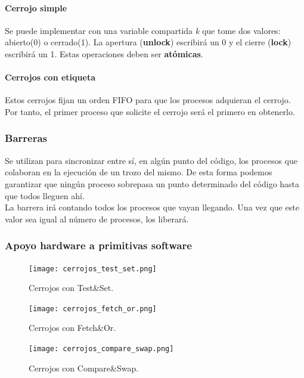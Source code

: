 \documentclass[12pt,spanish]{article}
\begin{document}
\paragraph{Cerrojo simple\\}

Se puede implementar con una variable compartida \emph{k} que tome dos valores: abierto(0) o cerrado(1). La apertura (\textbf{unlock}) escribirá un 0 y el cierre (\textbf{lock}) escribirá un 1. Estas operaciones deben ser \textbf{atómicas}.

\paragraph{Cerrojos con etiqueta\\}

Estos cerrojos fijan un orden FIFO para que los procesos adquieran el cerrojo. Por tanto, el primer proceso que solicite el cerrojo será el primero en obtenerlo.

\subsubsection{Barreras}

Se utilizan para sincronizar entre sí, en algún punto del código, los procesos que colaboran en la ejecución de un trozo del mismo. De esta forma podemos garantizar que ningún proceso sobrepasa un punto determinado del código hasta que todos lleguen ahí.\\

La barrera irá contando todos los procesos que vayan llegando. Una vez que este valor sea igual al número de procesos, los liberará.

\subsubsection{Apoyo hardware a primitivas software}

\begin{figure}[H]
\centering
\texttt{[image: cerrojos\_test\_set.png]}
\caption{Cerrojos con Test\&Set.}
\end{figure}

\begin{figure}[H]
\centering
\texttt{[image: cerrojos\_fetch\_or.png]}
\caption{Cerrojos con Fetch\&Or.}
\end{figure}

\begin{figure}[H]
\centering
\texttt{[image: cerrojos\_compare\_swap.png]}
\caption{Cerrojos con Compare\&Swap.}
\end{figure}
\end{document}
